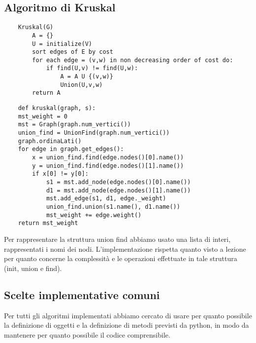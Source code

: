 \clearpage

\subsection{Algoritmo di Kruskal\label{sec:kruskal}}
\begin{verbatim}
    Kruskal(G)
        A = {}
        U = initialize(V)
        sort edges of E by cost
        for each edge = (v,w) in non decreasing order of cost do:
            if find(U,v) != find(U,w):
                A = A U {(v,w)}
                Union(U,v,w)
        return A
\end{verbatim}

\begin{verbatim}
    def kruskal(graph, s):
    mst_weight = 0
    mst = Graph(graph.num_vertici())
    union_find = UnionFind(graph.num_vertici())
    graph.ordinaLati()
    for edge in graph.get_edges():
        x = union_find.find(edge.nodes()[0].name())
        y = union_find.find(edge.nodes()[1].name())
        if x[0] != y[0]:
            s1 = mst.add_node(edge.nodes()[0].name())
            d1 = mst.add_node(edge.nodes()[1].name())
            mst.add_edge(s1, d1, edge._weight)
            union_find.union(s1.name(), d1.name())
            mst_weight += edge.weight()    
    return mst_weight
\end{verbatim}

Per rappresentare la struttura union find abbiamo usato una lista di interi, rappresentati i nomi dei nodi.
L'implementazione rispetta quanto visto a lezione per quanto concerne la complessità e le operazioni effettuate in tale struttura (init, union e find).

\subsection{Scelte implementative comuni\label{sec:comuni}}
Per tutti gli algoritmi implementati abbiamo cercato di usare per quanto possibile la definizione di oggetti e la definizione di metodi previsti da python, in modo da mantenere per quanto possibile il codice comprensibile.